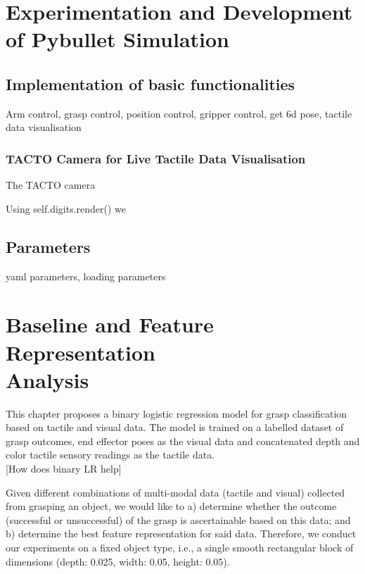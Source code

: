 \documentclass[11pt, a4paper]{report}
\theoremstyle{definition}
\begin{document}
\chapter{Experimentation and Development of Pybullet Simulation}
\label{chap:3}


\section{Implementation of basic functionalities}
Arm control, grasp control, position control, gripper control, get 6d pose, tactile data visualisation

\subsection{TACTO Camera for Live Tactile Data Visualisation}
\label{sec:}
The TACTO camera \cite{Wang2022TACTO}

Using self.digits.render() we 


\section{Parameters}
yaml parameters, loading parameters


\chapter{Baseline and Feature Representation \\ Analysis}
\label{chap:4}
This chapter proposes a binary logistic regression model for grasp classification based on tactile and visual data. The model is trained on a labelled dataset of grasp outcomes, end effector poses as the visual data and concatenated depth and color tactile sensory readings as the tactile data.\\

[How does binary LR help]

Given different combinations of multi-modal data (tactile and visual) collected from grasping an object, we would like to a) determine whether the outcome (successful or unsuccessful) of the grasp is ascertainable based on this data; and b) determine the best feature representation for said data. Therefore, we conduct our experiments on a fixed object type, i.e., a single smooth rectangular block of dimensions (depth: 0.025, width: 0.05, height: 0.05).
\end{document}
